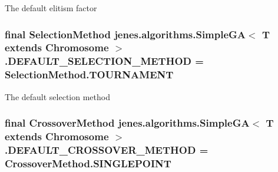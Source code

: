 The default elitism factor \hypertarget{classjenes_1_1algorithms_1_1_simple_g_a_3_01_t_01extends_01_chromosome_01_4_93d44174d00fdf0a8ebedfa3badcde66}{
\subsubsection[DEFAULT\_\-SELECTION\_\-METHOD]{\setlength{\rightskip}{0pt plus 5cm}final {\bf SelectionMethod} jenes.algorithms.SimpleGA$<$ T extends Chromosome $>$.{\bf DEFAULT\_\-SELECTION\_\-METHOD} = SelectionMethod.TOURNAMENT}}
\label{classjenes_1_1algorithms_1_1_simple_g_a_3_01_t_01extends_01_chromosome_01_4_93d44174d00fdf0a8ebedfa3badcde66}


The default selection method \hypertarget{classjenes_1_1algorithms_1_1_simple_g_a_3_01_t_01extends_01_chromosome_01_4_568bc71d97e1221ff4c7a4cc2b9a938d}{
\subsubsection[DEFAULT\_\-CROSSOVER\_\-METHOD]{\setlength{\rightskip}{0pt plus 5cm}final {\bf CrossoverMethod} jenes.algorithms.SimpleGA$<$ T extends Chromosome $>$.{\bf DEFAULT\_\-CROSSOVER\_\-METHOD} = CrossoverMethod.SINGLEPOINT}}
\label{classjenes_1_1algorithms_1_1_simple_g_a_3_01_t_01extends_01_chromosome_01_4_568bc71d97e1221ff4c7a4cc2b9a938d}


